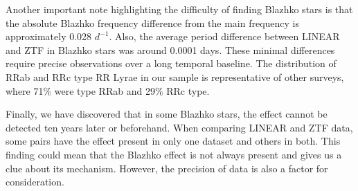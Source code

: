 \documentclass{aa}
\begin{document}
Another important note highlighting the difficulty of finding Blazhko stars is that the absolute Blazhko frequency difference from the main frequency is approximately 0.028 $d^{-1}$. Also, the average period difference between LINEAR and ZTF in Blazhko stars was around 0.0001 days. These minimal differences require precise observations over a long temporal baseline. The distribution of RRab and RRc type RR Lyrae in our sample is representative of other surveys, where 71\% were type RRab and 29\% RRc type.

Finally, we have discovered that in some Blazhko stars, the effect cannot be detected ten years later or beforehand. When comparing LINEAR and ZTF data, some pairs have the effect present in only one dataset and others in both. This finding could mean that the Blazhko effect is not always present and gives us a clue about its mechanism. However, the precision of data is also a factor for consideration. 
\end{document}
